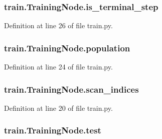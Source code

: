 \subsubsection[{\texorpdfstring{is\+\_\+terminal\+\_\+step}{is_terminal_step}}]{\setlength{\rightskip}{0pt plus 5cm}train.\+Training\+Node.\+is\+\_\+terminal\+\_\+step}\hypertarget{classtrain_1_1_training_node_aa17107636d9a2df25960aa1076d9b987}{}\label{classtrain_1_1_training_node_aa17107636d9a2df25960aa1076d9b987}


Definition at line 26 of file train.\+py.

\subsubsection[{\texorpdfstring{population}{population}}]{\setlength{\rightskip}{0pt plus 5cm}train.\+Training\+Node.\+population}\hypertarget{classtrain_1_1_training_node_a73a06dfa3230d4f26cc9767488b30385}{}\label{classtrain_1_1_training_node_a73a06dfa3230d4f26cc9767488b30385}


Definition at line 24 of file train.\+py.

\subsubsection[{\texorpdfstring{scan\+\_\+indices}{scan_indices}}]{\setlength{\rightskip}{0pt plus 5cm}train.\+Training\+Node.\+scan\+\_\+indices}\hypertarget{classtrain_1_1_training_node_adc0b51385828f502a6394aadc342eb56}{}\label{classtrain_1_1_training_node_adc0b51385828f502a6394aadc342eb56}


Definition at line 20 of file train.\+py.

\subsubsection[{\texorpdfstring{test}{test}}]{\setlength{\rightskip}{0pt plus 5cm}train.\+Training\+Node.\+test}\hypertarget{classtrain_1_1_training_node_a26350a860e1c0aaf7653da42c55fa93a}{}\label{classtrain_1_1_training_node_a26350a860e1c0aaf7653da42c55fa93a}


